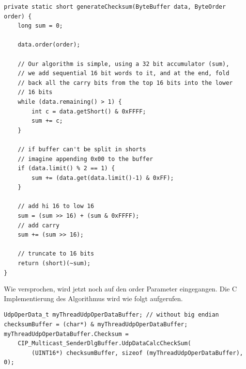 \newpage
\begin{lstlisting}
private static short generateChecksum(ByteBuffer data, ByteOrder order) {
    long sum = 0;
   
    data.order(order);
   
    // Our algorithm is simple, using a 32 bit accumulator (sum),
    // we add sequential 16 bit words to it, and at the end, fold
    // back all the carry bits from the top 16 bits into the lower
    // 16 bits
    while (data.remaining() > 1) {
        int c = data.getShort() & 0xFFFF;
        sum += c;       
    }
   
    // if buffer can't be split in shorts
    // imagine appending 0x00 to the buffer
    if (data.limit() % 2 == 1) {
        sum += (data.get(data.limit()-1) & 0xFF);
    }
           
    // add hi 16 to low 16
    sum = (sum >> 16) + (sum & 0xFFFF);
    // add carry
    sum += (sum >> 16);                
   
    // truncate to 16 bits
    return (short)(~sum);
}
\end{lstlisting}

Wie versprochen, wird jetzt noch auf den order Parameter eingegangen.
Die C Implementierung des Algorithmus wird wie folgt aufgerufen.
\begin{lstlisting}
UdpOperData_t myThreadUdpOperDataBuffer; // without big endian
checksumBuffer = (char*) & myThreadUdpOperDataBuffer;
myThreadUdpOperDataBuffer.Checksum = 
    CIP_Multicast_SenderDlgBuffer.UdpDataCalcCheckSum(
        (UINT16*) checksumBuffer, sizeof (myThreadUdpOperDataBuffer), 0); 
\end{lstlisting}

